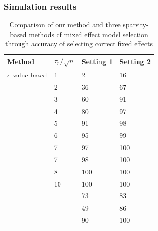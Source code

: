 \documentclass[handout,10pt]{beamer}
\begin{document}
\begin{frame}
\frametitle{Simulation results}

\begin{table}[t]
	\centering
	\begin{scriptsize}
    \begin{tabular}{llll}
    \hline
    Method          & $\tau_n / \sqrt n$ & Setting 1 & Setting 2 \\ \hline
    $e$-value based     & 1 & 2         & 16       \\
    ~               & 2 & 36      & 67        \\
    ~               & 3 & 60        & 91      \\
    ~               & 4 & 80        & 97      \\
    ~               & 5 & 91        & 98       \\
    ~               & 6 & 95      & 99       \\
    ~               & 7 & 97       & 100       \\
    ~               & 7 & 98       & 100       \\
    ~               & 8 & 100       & 100       \\
    ~               & 10 & 100       & 100       \\\hline
    \cite{BondellKrishnaGhosh10} & ~ & 73        & 83        \\
    \cite{PengLu12}         & ~ & 49        & 86        \\
    \cite{FanLi12}           & ~ & 90        & 100       \\ \hline
    \end{tabular}
    \caption*{Comparison of our method and three sparsity-based methods of mixed effect model selection through accuracy of selecting correct fixed effects}
	\label{table:simtable2MS}
    \end{scriptsize}
\end{table}
\end{frame}

\end{document}
